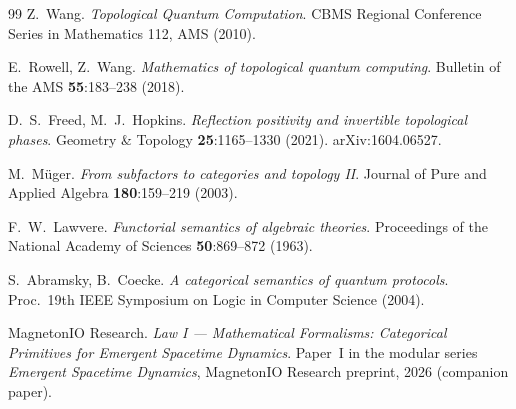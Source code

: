 \documentclass[12pt]{article}
\theoremstyle{plain}
\theoremstyle{definition}
\theoremstyle{remark}
\begin{document}
\begin{thebibliography}{99}
Z.\ Wang. \emph{Topological Quantum Computation}. CBMS Regional Conference Series in
Mathematics 112, AMS (2010).

E.\ Rowell, Z.\ Wang. \emph{Mathematics of topological quantum computing}. Bulletin of
the AMS \textbf{55}:183--238 (2018).

D.\ S.\ Freed, M.\ J.\ Hopkins. \emph{Reflection positivity and invertible topological
phases}. Geometry \& Topology \textbf{25}:1165--1330 (2021). arXiv:1604.06527.

M.\ M\"uger. \emph{From subfactors to categories and topology II}. Journal of Pure and
Applied Algebra \textbf{180}:159--219 (2003).

F.\ W.\ Lawvere. \emph{Functorial semantics of algebraic theories}. Proceedings of the
National Academy of Sciences \textbf{50}:869--872 (1963).

S.\ Abramsky, B.\ Coecke. \emph{A categorical semantics of quantum protocols}. Proc.\
19th IEEE Symposium on Logic in Computer Science (2004).

MagnetonIO Research. \emph{Law I --- Mathematical Formalisms: Categorical Primitives
for Emergent Spacetime Dynamics}. Paper~I in the modular series \emph{Emergent
Spacetime Dynamics}, MagnetonIO Research preprint, 2026 (companion paper).

\end{thebibliography}
\end{document}
